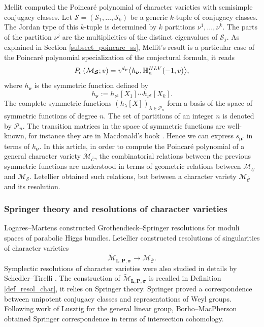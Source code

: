 \documentclass[11pt]{article}
\newcommand{\Subsubsection}{\subsubsection}
\newcommand{\rc}{\mathrm{c}}
\newcommand{\HLV}{\textup{HLV}}
\newcommand{\blangle}{\bigl\langle}
\newcommand{\brangle}{\bigr\rangle}
\theoremstyle{definition}
\theoremstyle{plain}
\newcommand{\Part}{\mathcal{P}}
\newcommand{\mlps}{\widetilde{\mathcal{M}}_{\boldsymbol{L},\boldsymbol{P},\boldsymbol{\sigma}}}
\newcommand{\mcbar}{\mathcal{M}_{\boldsymbol{\overline{\mathcal{C}}}}}
\begin{document}
Mellit \cite{Mellit2020} computed the Poincaré polynomial of character varieties with semisimple conjugacy classes. Let $\boldsymbol{\mathcal{S}}=\left(\mathcal{S}_1,\dots,\mathcal{S}_k\right)$ be a generic $k$-tuple of conjugacy classes. The Jordan type of this $k$-tuple is determined by $k$ partitions $\nu^1,\dots,\nu^k$. The parts of the partition $\nu^j$ are the multiplicities of the distinct eigenvalues of $\mathcal{S}_j$. As explained in Section \ref{subsect_poincare_ss}, Mellit's result is a particular case of the Poincaré polynomial specialization of the conjectural formula, it reads
\begin{equation}\label{eq_mellit_intro}
P_{\rc} \left(\mathcal{M}_{\boldsymbol{\mathcal{S}}};v\right) = v^{d_{\boldsymbol{\nu}}} \blangle h_{\boldsymbol{\nu}},\mathbb{H}_n^{\HLV}(-1,v)\brangle,
\end{equation}
where $h_{\boldsymbol{\nu}}$ is the symmetric function defined by
\[
h_{\boldsymbol{\nu}}:=h_{\nu^1}[X_1]\cdots h_{\nu^k}[X_k].
\]
The complete symmetric functions $\left(h_{\lambda}[X]\right)_{\lambda \in \Part_n}$ form a basis of the space of symmetric functions of degree $n$. The set of partitions of an integer $n$ is denoted by $\Part_n$. The transition matrices in the space of symmetric functions are well-known, for instance they are in Macdonald's book \cite{Macdonald}. Hence we can express $s_{\boldsymbol{\mu'}}$ in terms of $h_{\boldsymbol{\nu}}$. In this article, in order to compute the Poincaré polynomial of a general character variety $\mcbar$, the combinatorial relations between the previous symmetric functions are understood in terms of geometric relations between $\mcbar$ and $\mathcal{M}_{\boldsymbol{\mathcal{S}}}$. Letellier obtained such relations, but between a character variety $\mcbar$ and its resolution.

\Subsubsection{Springer theory and resolutions of character varieties}

Logares--Martens \cite{Logares_Martens} constructed Grothendieck--Springer resolutions for moduli spaces of parabolic Higgs bundles. Letellier \cite{Letellier13} constructed resolutions of singularities of character varieties
\[
\mlps\to\mcbar.
\]
Symplectic resolutions of character varieties were also studied in details by Schedler--Tirelli \cite{Schedler_Tirelli}. The construction of $\mlps$ is recalled in Definition \ref{def_resol_char}, it relies on Springer theory. Springer \cite{Springer1976} proved a correspondence between unipotent conjugacy classes and representations of Weyl groups. Following work of Lusztig \cite{Lusztig81} for the general linear group, Borho--MacPherson \cite{Borho_MacPherson} obtained Springer correspondence in terms of intersection cohomology.
\end{document}
